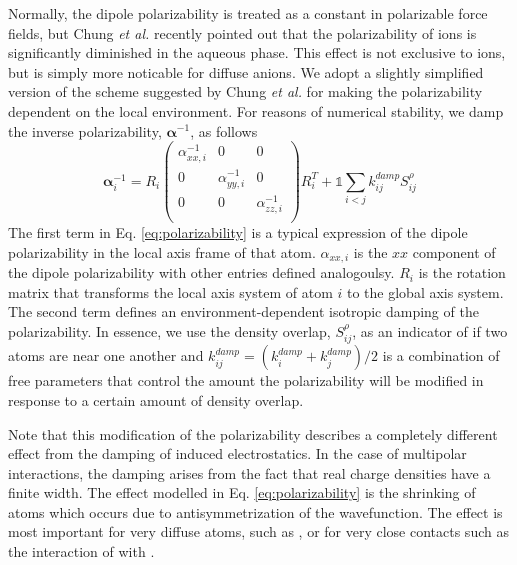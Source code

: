 \documentclass[journal=jacsat,manuscript=article]{achemso}
\begin{document}
Normally, the dipole polarizability is treated as a constant in polarizable force fields,
but Chung \textit{et al.} recently pointed out that the polarizability of ions
is significantly diminished in the aqueous phase.\cite{chung2022classical}
This effect is not exclusive to ions, but is simply more noticable for diffuse anions. We adopt a slightly
simplified version of the scheme suggested by Chung \textit{et al.} for making the polarizability dependent on the local
environment. For reasons of numerical stability, we damp the inverse polarizability, $\bm{\alpha}^{-1}$, as follows
\begin{equation}
  \bm{\alpha}^{-1}_i=
  R_i\begin{pmatrix}
    \alpha^{-1}_{xx,i} & 0 & 0 \\
    0 & \alpha^{-1}_{yy,i} & 0 \\
    0 & 0 & \alpha^{-1}_{zz,i} \\
  \end{pmatrix}R_i^T
    +\mathds{1}\sum_{i<j}k^{damp}_{ij}S_{ij}^{\rho}
    \label{eq:polarizability}
\end{equation}
\noindent
The first term in Eq. \ref{eq:polarizability} is a typical expression of the dipole polarizability
in the local axis frame of that atom. $\alpha_{xx,i}$ is the $xx$ component of the dipole polarizability
with other entries defined analogoulsy. $R_i$ is the rotation matrix that transforms the local
axis system of atom $i$ to the global axis system. The second term defines an environment-dependent
isotropic damping of the polarizability. In essence, we use the density overlap, $S_{ij}^\rho$,
as an indicator of if two atoms are near one another and $k_{ij}^{damp}=(k_{i}^{damp}+k_{j}^{damp})/2$
is a combination of free parameters that control the amount the polarizability will be modified
in response to a certain amount of density overlap.

Note that this modification of the polarizability describes a completely different
effect from the damping of induced electrostatics. In the case of multipolar interactions,
the damping arises from the fact that real charge densities have a finite width. The effect
modelled in Eq. \ref{eq:polarizability} is the shrinking of atoms which occurs due to
antisymmetrization of the wavefunction. The effect is most important for very diffuse atoms, such as ,
or for very close contacts such as the interaction of  with .
\end{document}
